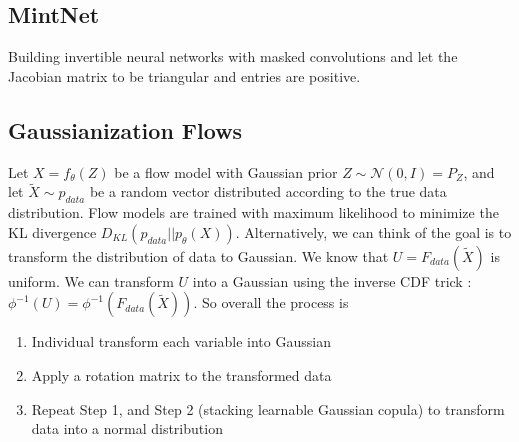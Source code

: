 \subsection{MintNet} 
Building invertible neural networks with masked convolutions and let the Jacobian matrix to be triangular and entries are positive. 

\subsection{Gaussianization Flows}
Let $X = f_\theta(Z)$ be a flow model with Gaussian prior $Z\sim \mathcal{N}(0,I) = P_Z$, and let $\tilde{X} \sim p_{data}$ be a random vector distributed according to the true data distribution. Flow models are trained with maximum likelihood to minimize the KL divergence $D_{KL}(p_{data}||p_\theta(X))$. Alternatively, we can think of the goal is to transform the distribution of data to Gaussian. We know that $U = F_{data}(\tilde{X})$ is uniform. We can transform $U$ into a Gaussian using the inverse CDF trick : $\phi^{-1}(U) = \phi^{-1}(F_{data}(\tilde{X}))$. So overall the process is 
    \begin{enumerate}
        \item Individual transform each variable into Gaussian 
        \item Apply a rotation matrix to the transformed data
        \item Repeat Step 1, and Step 2 (stacking learnable Gaussian copula) to transform data into a normal distribution 
    \end{enumerate}
